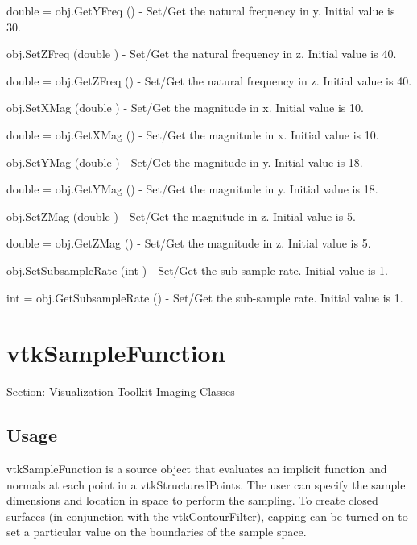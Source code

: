 \begin{DoxyItemize}
\item {\ttfamily double = obj.\-Get\-Y\-Freq ()} -\/ Set/\-Get the natural frequency in y. Initial value is 30.  
\item {\ttfamily obj.\-Set\-Z\-Freq (double )} -\/ Set/\-Get the natural frequency in z. Initial value is 40.  
\item {\ttfamily double = obj.\-Get\-Z\-Freq ()} -\/ Set/\-Get the natural frequency in z. Initial value is 40.  
\item {\ttfamily obj.\-Set\-X\-Mag (double )} -\/ Set/\-Get the magnitude in x. Initial value is 10.  
\item {\ttfamily double = obj.\-Get\-X\-Mag ()} -\/ Set/\-Get the magnitude in x. Initial value is 10.  
\item {\ttfamily obj.\-Set\-Y\-Mag (double )} -\/ Set/\-Get the magnitude in y. Initial value is 18.  
\item {\ttfamily double = obj.\-Get\-Y\-Mag ()} -\/ Set/\-Get the magnitude in y. Initial value is 18.  
\item {\ttfamily obj.\-Set\-Z\-Mag (double )} -\/ Set/\-Get the magnitude in z. Initial value is 5.  
\item {\ttfamily double = obj.\-Get\-Z\-Mag ()} -\/ Set/\-Get the magnitude in z. Initial value is 5.  
\item {\ttfamily obj.\-Set\-Subsample\-Rate (int )} -\/ Set/\-Get the sub-\/sample rate. Initial value is 1.  
\item {\ttfamily int = obj.\-Get\-Subsample\-Rate ()} -\/ Set/\-Get the sub-\/sample rate. Initial value is 1.  
\end{DoxyItemize}\hypertarget{vtkimaging_vtksamplefunction}{}\section{vtk\-Sample\-Function}\label{vtkimaging_vtksamplefunction}
Section\-: \hyperlink{sec_vtkimaging}{Visualization Toolkit Imaging Classes} \hypertarget{vtkwidgets_vtkxyplotwidget_Usage}{}\subsection{Usage}\label{vtkwidgets_vtkxyplotwidget_Usage}
vtk\-Sample\-Function is a source object that evaluates an implicit function and normals at each point in a vtk\-Structured\-Points. The user can specify the sample dimensions and location in space to perform the sampling. To create closed surfaces (in conjunction with the vtk\-Contour\-Filter), capping can be turned on to set a particular value on the boundaries of the sample space.

